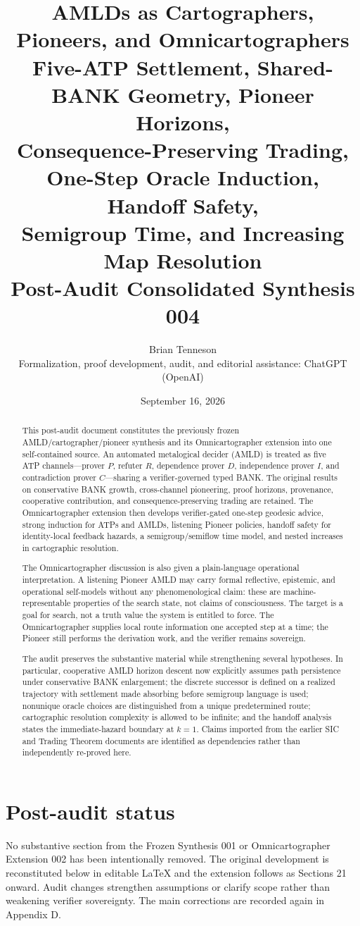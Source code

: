 \documentclass[11pt]{article}
\title{\textbf{AMLDs as Cartographers, Pioneers, and Omnicartographers}\\
\large Five-ATP Settlement, Shared-BANK Geometry, Pioneer Horizons,\\
Consequence-Preserving Trading, One-Step Oracle Induction, Handoff Safety,\\
Semigroup Time, and Increasing Map Resolution\\[1mm]
\normalsize Post-Audit Consolidated Synthesis 004}
\author{Brian Tenneson\\[2mm]
\small Formalization, proof development, audit, and editorial assistance: ChatGPT (OpenAI)}
\date{September 16, 2026}
\theoremstyle{remark}
\begin{document}
\maketitle

\begin{abstract}
This post-audit document constitutes the previously frozen AMLD/cartographer/pioneer synthesis and its Omnicartographer extension into one self-contained source. An automated metalogical decider (AMLD) is treated as five ATP channels---prover $P$, refuter $R$, dependence prover $D$, independence prover $I$, and contradiction prover $C$---sharing a verifier-governed typed BANK. The original results on conservative BANK growth, cross-channel pioneering, proof horizons, provenance, cooperative contribution, and consequence-preserving trading are retained. The Omnicartographer extension then develops verifier-gated one-step geodesic advice, strong induction for ATPs and AMLDs, listening Pioneer policies, handoff safety for identity-local feedback hazards, a semigroup/semiflow time model, and nested increases in cartographic resolution.

The Omnicartographer discussion is also given a plain-language operational interpretation. A listening Pioneer AMLD may carry formal reflective, epistemic, and operational self-models without any phenomenological claim: these are machine-representable properties of the search state, not claims of consciousness. The target is a goal for search, not a truth value the system is entitled to force. The Omnicartographer supplies local route information one accepted step at a time; the Pioneer still performs the derivation work, and the verifier remains sovereign.

The audit preserves the substantive material while strengthening several hypotheses. In particular, cooperative AMLD horizon descent now explicitly assumes path persistence under conservative BANK enlargement; the discrete successor is defined on a realized trajectory with settlement made absorbing before semigroup language is used; nonunique oracle choices are distinguished from a unique predetermined route; cartographic resolution complexity is allowed to be infinite; and the handoff analysis states the immediate-hazard boundary at $k=1$. Claims imported from the earlier SIC and Trading Theorem documents are identified as dependencies rather than independently re-proved here.
\end{abstract}

\section*{Post-audit status}
No substantive section from the Frozen Synthesis 001 or Omnicartographer Extension 002 has been intentionally removed. The original development is reconstituted below in editable LaTeX and the extension follows as Sections 21 onward. Audit changes strengthen assumptions or clarify scope rather than weakening verifier sovereignty. The main corrections are recorded again in Appendix D.
\end{document}
